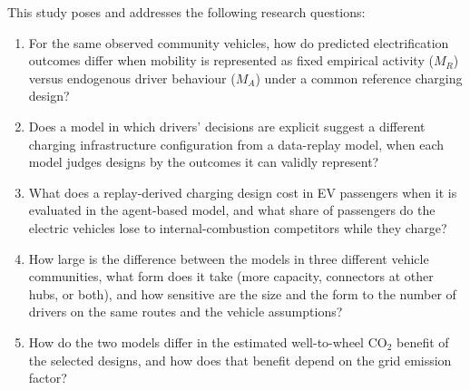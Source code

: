 \documentclass{elsarticle}
\newcommand{\MR}{\ensuremath{M_R}}
\newcommand{\MA}{\ensuremath{M_A}}
\begin{document}
This study poses and addresses the following research questions:
\begin{enumerate}
    \item For the same observed community vehicles, how do predicted electrification outcomes differ when mobility is represented as fixed empirical activity (\MR) versus endogenous driver behaviour (\MA) under a common reference charging design?
    \item Does a model in which drivers' decisions are explicit suggest a different charging infrastructure configuration from a data-replay model, when each model judges designs by the outcomes it can validly represent?
    \item What does a replay-derived charging design cost in EV passengers when it is evaluated in the agent-based model, and what share of passengers do the electric vehicles lose to internal-combustion competitors while they charge?
    \item How large is the difference between the models in three different vehicle communities, what form does it take (more capacity, connectors at other hubs, or both), and how sensitive are the size and the form to the number of drivers on the same routes and the vehicle assumptions?
    \item How do the two models differ in the estimated well-to-wheel CO$_2$ benefit of the selected designs, and how does that benefit depend on the grid emission factor?
\end{enumerate}
\end{document}
